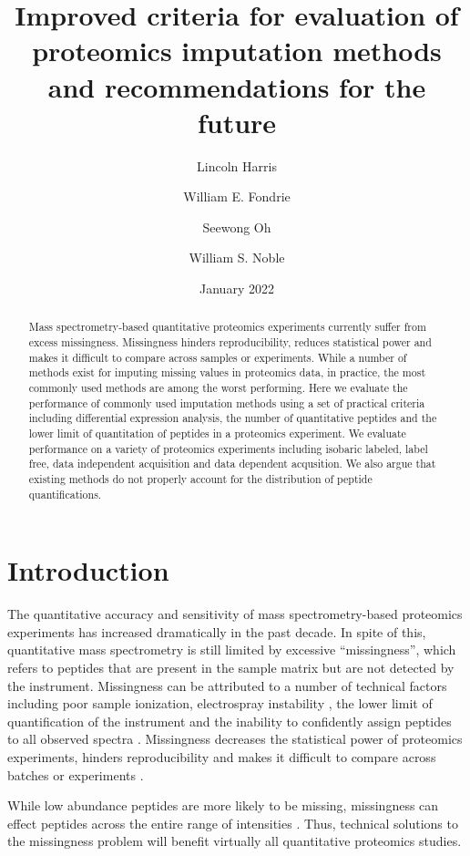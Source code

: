 \documentclass{article}
\title{Improved criteria for evaluation of proteomics imputation methods and recommendations for the future}
\author[1]{Lincoln Harris}
\author[2]{William E. Fondrie}
\author[3]{Seewong Oh}
\author[1,3]{William S. Noble}
\affil[1]{Department of Genome Sciences, University of Washington}
\affil[2]{Talus Biosciences}
\affil[3]{Paul G.\ Allen School of Computer Science and Engineering,
  University of Washington}
\date{January 2022}
\newcommand{\fixme}[1]{{\color{red}{#1}}}
\begin{document}
\maketitle

\begin{abstract}
\noindent
\small
Mass spectrometry-based quantitative proteomics experiments currently suffer from excess missingness. Missingness hinders reproducibility, reduces statistical power and makes it difficult to compare across samples or experiments. While a number of methods exist for imputing missing values in proteomics data, in practice, the most commonly used methods are among the worst performing. Here we evaluate the performance of commonly used imputation methods using a set of practical criteria including differential expression analysis, the number of quantitative peptides and the lower limit of quantitation of peptides in a proteomics experiment. We evaluate performance on a variety of proteomics experiments including isobaric labeled, label free, data independent acquisition and data dependent acqusition. We also argue that existing methods do not properly account for the distribution of peptide quantifications. 

\end{abstract}

\section{Introduction}
The quantitative accuracy and sensitivity of mass spectrometry-based proteomics experiments has increased dramatically in the past decade. In spite of this, quantitative mass spectrometry is still limited by excessive ``missingness'', which refers to peptides that are present in the sample matrix but are not detected by the instrument. Missingness can be attributed to a number of technical factors including poor sample ionization, electrospray instability \fixme{[what does this mean?]}, the lower limit of quantification of the instrument and the inability to confidently assign peptides to all observed spectra \cite{Bramer:review, Webb-Robertson:review}. Missingness decreases the statistical power of proteomics experiments, hinders reproducibility and makes it difficult to compare across batches or experiments \cite{Bramer:review, Webb-Robertson:review}. 

While low abundance peptides are more likely to be missing, missingness can effect peptides across the entire range of intensities \cite{lazar}. Thus, technical solutions to the missingness problem will benefit virtually all quantitative proteomics studies. 
\end{document}
